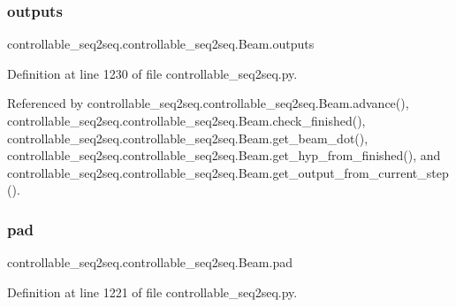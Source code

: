 \subsubsection{\texorpdfstring{outputs}{outputs}}
{\footnotesize\ttfamily controllable\+\_\+seq2seq.\+controllable\+\_\+seq2seq.\+Beam.\+outputs}



Definition at line 1230 of file controllable\+\_\+seq2seq.\+py.



Referenced by controllable\+\_\+seq2seq.\+controllable\+\_\+seq2seq.\+Beam.\+advance(), controllable\+\_\+seq2seq.\+controllable\+\_\+seq2seq.\+Beam.\+check\+\_\+finished(), controllable\+\_\+seq2seq.\+controllable\+\_\+seq2seq.\+Beam.\+get\+\_\+beam\+\_\+dot(), controllable\+\_\+seq2seq.\+controllable\+\_\+seq2seq.\+Beam.\+get\+\_\+hyp\+\_\+from\+\_\+finished(), and controllable\+\_\+seq2seq.\+controllable\+\_\+seq2seq.\+Beam.\+get\+\_\+output\+\_\+from\+\_\+current\+\_\+step().

\mbox{\label{classcontrollable__seq2seq_1_1controllable__seq2seq_1_1Beam_a2647f98520bc6581a5da7d4c3532abe8}} 
\subsubsection{\texorpdfstring{pad}{pad}}
{\footnotesize\ttfamily controllable\+\_\+seq2seq.\+controllable\+\_\+seq2seq.\+Beam.\+pad}



Definition at line 1221 of file controllable\+\_\+seq2seq.\+py.

\mbox{\label{classcontrollable__seq2seq_1_1controllable__seq2seq_1_1Beam_ac8bd05223ef3eb100250a34b98ec515c}} 
